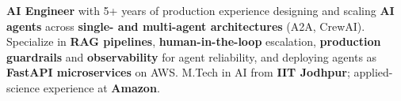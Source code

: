 \documentclass[letter,10pt]{article}
\begin{document}

\textbf{AI Engineer} with 5+ years of production experience designing and scaling \textbf{AI agents} across \textbf{single- and multi-agent architectures} (A2A, CrewAI).
Specialize in \textbf{RAG pipelines}, \textbf{human-in-the-loop} escalation, \textbf{production guardrails} and \textbf{observability} for agent reliability, and deploying agents as \textbf{FastAPI microservices} on AWS.
M.Tech in AI from \textbf{IIT Jodhpur}; applied-science experience at \textbf{Amazon}.
\end{document}
